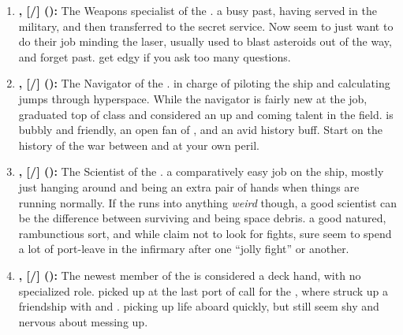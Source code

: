 \documentclass[blue]{TMFHope}
\begin{document}
\begin{enumerate}
  \item \textbf{\cWeap{\full}, [\cWeap{\they}/\cWeap{\them}] (\cWeap{\MYplayer}):} The Weapons specialist of the \pNew{}. \cWeap{\They} \cWeap{\have} a busy past, having served in the military, and then transferred to the secret service. Now \cWeap{\they} seem\cWeap{\plural} to just want to do their job minding the \pNew{} laser, usually used to blast asteroids out of the way, and forget \cWeap{\their} past. \cWeap{} get\cWeap{\plural} edgy if you ask too many questions.
  
  \item \textbf{\cNav{\full}, [\cNav{\they}/\cNav{\them}] (\cNav{\MYplayer}):} The Navigator of the \pNew{}. \cNav{\They} \cNav{\are} in charge of piloting the ship and calculating jumps through hyperspace. While the \pNew{} navigator is fairly new at the job, \cNav{\they} graduated top of \cNav{\their} class and \cNav{\are} considered an up and coming talent in the field. \cNav{} is bubbly and friendly, an open fan\cNav{\kid} of \cCap{}, and an avid history buff. Start \cNav{\them} on the history of the war between \pPlan{} and \pEdge{} at your own peril.
  
  \item \textbf{\cSci{\full}, [\cSci{\they}/\cSci{\them}] (\cSci{\MYplayer}):} The Scientist of the \pNew{}. \cSci{\They} \cSci{\have} a comparatively easy job on the ship, mostly just hanging around and being an extra pair of hands when things are running normally. If the \pNew{} runs into anything \emph{weird} though, a good scientist can be the difference between surviving and being space debris. \cSci{\They} \cSci{\are} a good natured, rambunctious sort, and while \cSci{\they} claim\cSci{\plural} not to look for fights, \cSci{\they} sure seem\cSci{\plural} to spend a lot of \cSci{\their} port-leave in the infirmary after one ``jolly fight'' or another.
  
  \item \textbf{\cBoy{\full}, [\cBoy{\they}/\cBoy{\them}] (\cBoy{\MYplayer}):} The newest member of the \pNew{} is considered a deck hand, with no specialized role. \cBoy{\They} \cBoy{\were} picked up at the last port of call for the \pNew{}, where \cBoy{\they} struck up a friendship with \cEng{} and \cNav{}. \cBoy{\They} \cBoy{\are} picking up life aboard \pNew{} quickly, but still seem shy and nervous about messing up.
\end{enumerate}
\end{document}
